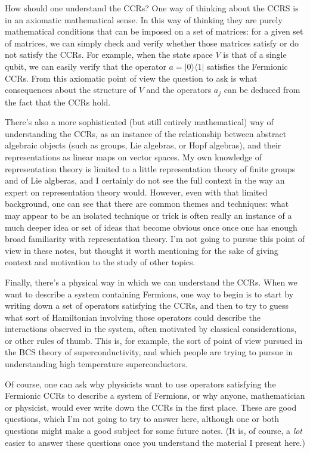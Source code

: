 \documentclass[12pt]{article}
\begin{document}
{How should one understand the CCRs?  One way of thinking about the
CCRS is in an axiomatic mathematical sense.  In this way of thinking
they are purely mathematical conditions that can be imposed on a set
of matrices: for a given set of matrices, we can simply check and
verify whether those matrices satisfy or do not satisfy the CCRs.  For
example, when the state space $V$ is that of a single qubit, we can
easily verify that the operator $a = |0\rangle \langle 1|$ satisfies
the Fermionic CCRs.  From this axiomatic point of view the question to
ask is what consequences about the structure of $V$ and the operators
$a_j$ can be deduced from the fact that the CCRs hold.  

There's also a more sophisticated (but still entirely mathematical)
way of understanding the CCRs, as an instance of the relationship
between abstract algebraic objects (such as groups, Lie algebras, or
Hopf algebras), and their representations as linear maps on vector
spaces.  My own knowledge of representation theory is limited to a
little representation theory of finite groups and of Lie algberas, and
I certainly do not see the full context in the way an expert on
representation theory would.  However, even with that limited
background, one can see that there are common themes and techniques:
what may appear to be an isolated technique or trick is often really
an instance of a much deeper idea or set of ideas that become obvious
once once one has enough broad familiarity with representation theory.
I'm not going to pursue this point of view in these notes, but thought
it worth mentioning for the sake of giving context and motivation to
the study of other topics.

Finally, there's a physical way in which we can understand the CCRs.
When we want to describe a system containing Fermions, one way to
begin is to start by writing down a set of operators satisfying the
CCRs, and then to try to guess what sort of Hamiltonian involving
those operators could describe the interactions observed in the
system, often motivated by classical considerations, or other rules of
thumb. This is, for example, the sort of point of view pursued in the
BCS theory of superconductivity, and which people are trying to pursue
in understanding high temperature superconductors.

Of course, one can ask why physicists want to use operators satisfying
the Fermionic CCRs to describe a system of Fermions, or why anyone,
mathematician or physicist, would ever write down the CCRs in the
first place.  These are good questions, which I'm not going to try to
answer here, although one or both questions might make a good subject
for some future notes.  (It is, of course, a \emph{lot} easier to
answer these questions once you understand the material I present
here.)

}
\end{document}
